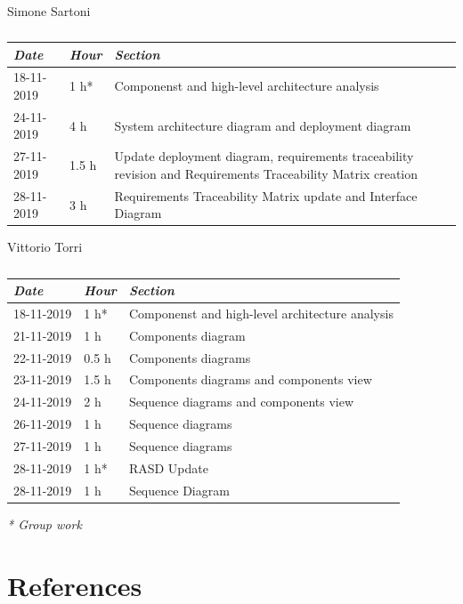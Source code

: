 \documentclass[a4paper]{report}
\begin{document}
\vspace*{1 cm}
\begin{table}[H]
\centering
Simone Sartoni \\
\begin{tabular}{p{2cm}p{1.5cm}p{7cm}}
\toprule
\textit{Date} & \textit{Hour} & \textit{Section} \\ \midrule
18-11-2019 & 1 h* & Componenst and high-level architecture analysis \\ \midrule
24-11-2019 & 4 h &  System architecture diagram and deployment diagram\\ \midrule
27-11-2019 & 1.5 h & Update deployment diagram, requirements traceability revision and Requirements Traceability Matrix creation \\ \midrule
28-11-2019 & 3 h & Requirements Traceability Matrix update and Interface Diagram \\ \midrule

\bottomrule
\end{tabular}
\caption[Simone Sartoni's effort table]{}
\end{table}
\vspace*{1 cm}
\begin{table}[H]
\centering
Vittorio Torri \\
\begin{tabular}{p{2cm}p{1.5cm}p{7cm}}
\toprule
\textit{Date} & \textit{Hour} & \textit{Section} \\ \midrule
18-11-2019 & 1 h* & Componenst and high-level architecture analysis \\ \midrule
21-11-2019 & 1 h  & Components diagram \\ \midrule
22-11-2019 & 0.5 h & Components diagrams \\ \midrule
23-11-2019 & 1.5 h & Components diagrams and components view\\ \midrule
24-11-2019 & 2 h & Sequence diagrams and components view \\ \midrule
26-11-2019 & 1 h & Sequence diagrams \\ \midrule
27-11-2019 & 1 h & Sequence diagrams \\ \midrule
28-11-2019 & 1 h* & RASD Update \\ \midrule
28-11-2019 & 1 h & Sequence Diagram \\ \midrule
\bottomrule
\end{tabular}
\caption[Vittorio Torri's effort table]{}
\end{table}
\textit{* Group work}

\chapter{References}
\end{document}
